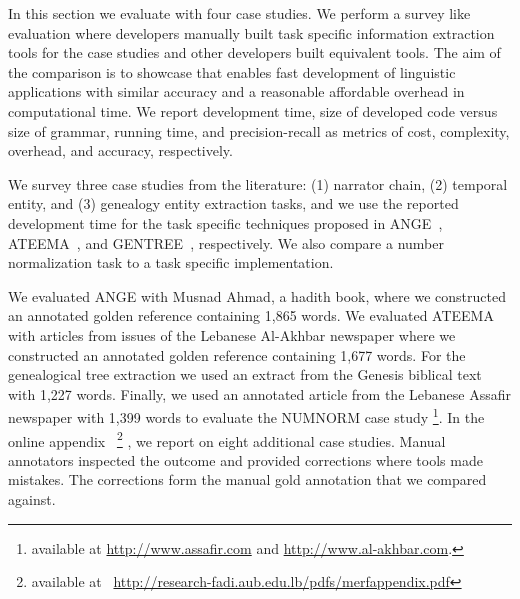 In this section we evaluate \framework with four case studies. 
We perform a survey like evaluation where developers manually 
built task specific information extraction tools for the case studies 
and other developers built equivalent \framework tools. 
The aim of the comparison is to showcase that \framework enables 
fast development of linguistic applications with similar accuracy 
and a reasonable affordable overhead in computational time. 
We report development time,
size of developed code versus size of grammar,
running time, and 
precision-recall as metrics
of cost, complexity, overhead, and accuracy,
respectively. 

We survey three case studies from the literature: 
(1) narrator chain, (2) temporal entity, and (3) genealogy entity extraction 
tasks, and we use the reported development time for the task specific 
techniques proposed in
ANGE~\cite{ZaMaFlairs2012HadithBio}, 
ATEEMA~\cite{ZaMa2012IJCLATime},  and
GENTREE~\cite{ZaMaHaCicling2012Entity}, respectively. 
%
We also compare a \framework number normalization task to 
a task specific implementation. 

We evaluated ANGE with
Musnad Ahmad, a hadith book, where we constructed an annotated 
golden reference containing 1,865 words.
We evaluated ATEEMA 
with articles from issues of  the Lebanese 
Al-Akhbar newspaper where we constructed 
an annotated golden reference containing 1,677 words. 
For the genealogical tree extraction we used 
an extract from the Genesis biblical text with 1,227 words.
Finally, we used an annotated article from the Lebanese Assafir
newspaper with 1,399 words to evaluate the NUMNORM case study
\footnote{available at \url{http://www.assafir.com} and 
\url{http://www.al-akhbar.com}.}. 
%
In the online appendix%
~\footnote{available at ~\url{http://research-fadi.aub.edu.lb/pdfs/merfappendix.pdf}}
, we report on eight additional \framework case studies.
Manual annotators inspected the outcome and provided corrections where tools 
made mistakes.
The corrections form the manual gold annotation that we compared against.


